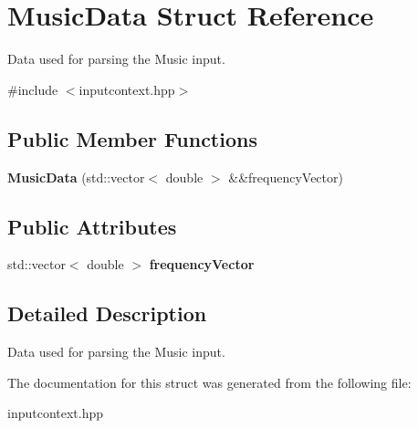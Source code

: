 \hypertarget{structMusicData}{}\section{Music\+Data Struct Reference}
\label{structMusicData}


Data used for parsing the Music input.  




{\ttfamily \#include $<$inputcontext.\+hpp$>$}

\subsection*{Public Member Functions}
\begin{DoxyCompactItemize}
\item 
\mbox{\label{structMusicData_aea401e148e5615e4eb1bd39154d9f0b4}} 
{\bfseries Music\+Data} (std\+::vector$<$ double $>$ \&\&frequency\+Vector)
\end{DoxyCompactItemize}
\subsection*{Public Attributes}
\begin{DoxyCompactItemize}
\item 
\mbox{\label{structMusicData_a172fa273494c06fd7c1ce0ebb7375264}} 
std\+::vector$<$ double $>$ {\bfseries frequency\+Vector}
\end{DoxyCompactItemize}


\subsection{Detailed Description}
Data used for parsing the Music input. 

The documentation for this struct was generated from the following file\+:\begin{DoxyCompactItemize}
\item 
inputcontext.\+hpp\end{DoxyCompactItemize}
